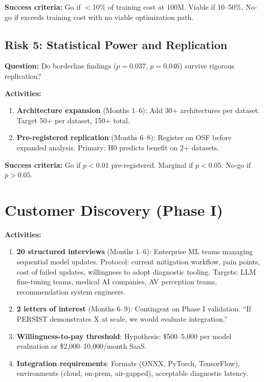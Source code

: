 \documentclass[11pt,letterpaper]{article}
\begin{document}
\textbf{Success criteria:} Go if $<$10\% of training cost at 100M. Viable if 10--50\%. No-go if exceeds training cost with no viable optimization path.

\subsection{Risk 5: Statistical Power and Replication}

\textbf{Question:} Do borderline findings ($p = 0.037$, $p = 0.046$) survive rigorous replication?

\textbf{Activities:}
\begin{enumerate}[nosep]
  \item \textbf{Architecture expansion} (Months 1--6): Add 30+ architectures per dataset. Target 50+ per dataset, 150+ total.
  \item \textbf{Pre-registered replication} (Months 6--8): Register on OSF before expanded analysis. Primary: H0 predicts benefit on 2+ datasets.
\end{enumerate}

\textbf{Success criteria:} Go if $p < 0.01$ pre-registered. Marginal if $p < 0.05$. No-go if $p > 0.05$.

\section{Customer Discovery (Phase I)}

\textbf{Activities:}
\begin{enumerate}[nosep]
  \item \textbf{20 structured interviews} (Months 1--6): Enterprise ML teams managing sequential model updates. Protocol: current mitigation workflow, pain points, cost of failed updates, willingness to adopt diagnostic tooling. Targets: LLM fine-tuning teams, medical AI companies, AV perception teams, recommendation system engineers.
  \item \textbf{2 letters of interest} (Months 6--9): Contingent on Phase I validation. ``If PERSIST demonstrates X at scale, we would evaluate integration.''
  \item \textbf{Willingness-to-pay threshold}: Hypothesis: \$500--5,000 per model evaluation or \$2,000--10,000/month SaaS.
  \item \textbf{Integration requirements}: Formats (ONNX, PyTorch, TensorFlow), environments (cloud, on-prem, air-gapped), acceptable diagnostic latency.
\end{enumerate}
\end{document}
